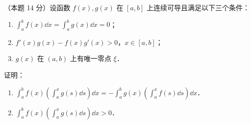 \begin{problems}
\item[六、]（本题 14 分）设函数 $f(x),g(x)$ 在 $[a,b]$ 上连续可导且满足以下三个条件：
\begin{enumerate}[label=(\roman*)]
  \item $\displaystyle \int_a^b f(x)\dd x=\int_a^b g(x)\dd x=0$；
  \item $f'(x)g(x)-f(x)g'(x)>0$，$x\in[a,b]$；
  \item $g(x)$ 在 $(a,b)$ 上有唯一零点 $\xi$．
\end{enumerate}
证明：
\begin{enumerate}
  \item $\displaystyle \int_a^b f(x)\left(\int_a^x g(s)\dd s\right)\dd x=-\int_a^b g(x)\left(\int_a^x f(s)\dd s\right)\dd x$．
  \item $\displaystyle \int_a^b f(x)\left(\int_a^x g(s)\dd s\right)\dd x>0$．
\end{enumerate}
\end{problems}
